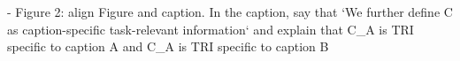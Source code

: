 - Figure 2: align Figure and caption. In the caption, say that `We further define C as caption-specific task-relevant information` and explain that C_A is TRI specific to caption A and C_A is TRI specific to caption B